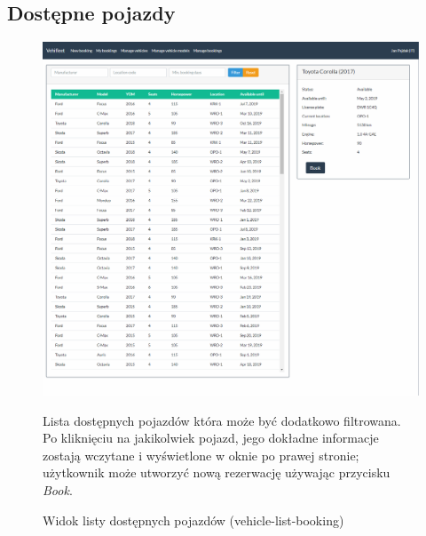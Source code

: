 \documentclass[eng,printmode,openany]{mgr}
\begin{document}
\subsection{Dostępne pojazdy}
\begin{figure}[H]
	\centering
	\includegraphics[width=\textwidth]{images/views/vehicle-booking-2.png}
	\caption{Widok listy dostępnych pojazdów (vehicle-list-booking)}
	\small 
	Lista dostępnych pojazdów która może być dodatkowo filtrowana. Po kliknięciu na jakikolwiek pojazd, jego dokładne informacje zostają wczytane i wyświetlone w oknie po prawej stronie; użytkownik może utworzyć nową rezerwację używając przycisku \textit{Book}.
\end{figure}
\end{document}
